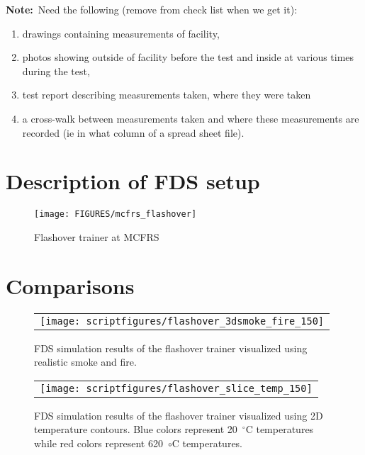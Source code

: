 \documentclass[11pt]{book}
\newcommand{\note}{{\bf Note:}}
\begin{document}
\note\ Need the following (remove from check list when we get it):
\begin{enumerate}
\item drawings containing measurements of facility,
\item photos showing outside of facility before the test and inside at various times during the test,
\item test report describing
measurements taken, where they were taken
\item a cross-walk between measurements taken and where these measurements are recorded (ie
in what column of a spread sheet file).
\end{enumerate}

\section{Description of FDS setup}
\begin{figure}[\figoptions]
\begin{center}
\texttt{[image: FIGURES/mcfrs\_flashover]}
\end{center}
\caption {Flashover trainer at MCFRS}
\label{figflashoversmoke}%
\end{figure}

\section{Comparisons}

\begin{figure}[\figoptions]
\begin{center}
\begin{tabular}{c}
 \texttt{[image: scriptfigures/flashover\_3dsmoke\_fire\_150]}
\end{tabular}
\end{center}
\caption {FDS simulation results of the flashover trainer visualized
using realistic smoke and fire.}
\label{figflashoversmoke}%
\end{figure}

\begin{figure}[\figoptions]
\begin{center}
\begin{tabular}{c}
 \texttt{[image: scriptfigures/flashover\_slice\_temp\_150]}
\end{tabular}
\end{center}
\caption {FDS simulation results of the flashover trainer visualized
using 2D temperature contours.  Blue colors represent 20~$^\circ$C
temperatures while red colors represent 620~$\circ$C temperatures.}
\label{figflashoversmokeslice}%
\end{figure}
\end{document}
